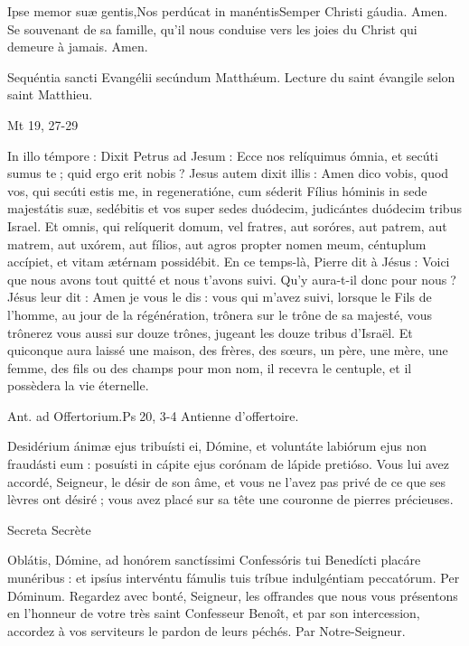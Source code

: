 \begin{paracol}{2}
Ipse memor suæ gentis,Nos perdúcat in manéntisSemper Christi gáudia. Amen.
\switchcolumn
Se souvenant de sa famille, qu’il nous conduise vers les joies du Christ qui demeure à jamais. Amen.
\switchcolumn*

Sequéntia sancti Evangélii secúndum Matthǽum.
\switchcolumn
Lecture du saint évangile selon saint Matthieu.
\switchcolumn*

Mt 19, 27-29
\switchcolumn

\switchcolumn*

In illo témpore : Dixit Petrus ad  Jesum : Ecce nos relíquimus ómnia, et secúti sumus te ; quid ergo erit nobis ? Jesus autem dixit illis : Amen dico vobis, quod vos, qui secúti estis me, in regeneratióne, cum séderit Fílius hóminis in sede majestátis suæ, sedébitis et vos super sedes duódecim, judicántes duódecim tribus Israel. Et omnis, qui relíquerit domum, vel fratres, aut soróres, aut patrem, aut matrem, aut uxórem, aut fílios, aut agros propter nomen meum, céntuplum accípiet, et vitam ætérnam possidébit.
\switchcolumn
En ce temps-là, Pierre dit à Jésus : Voici que nous avons tout quitté et nous t’avons suivi. Qu’y aura-t-il donc pour nous ? Jésus leur dit : Amen je vous le dis : vous qui m’avez suivi, lorsque le Fils de l’homme, au jour de la régénération, trônera sur le trône de sa majesté, vous trônerez vous aussi sur douze trônes, jugeant les douze tribus d’Israël. Et quiconque aura laissé une maison, des frères, des sœurs, un père, une mère, une femme, des fils ou des champs pour mon nom, il recevra le centuple, et il possèdera la vie éternelle.
\switchcolumn*

Ant. ad Offertorium.\hfill Ps 20, 3-4
\switchcolumn
Antienne d’offertoire.
\switchcolumn*

Desidérium ánimæ ejus tribuísti ei, Dómine, et voluntáte labiórum ejus non fraudásti eum : posuísti in cápite ejus corónam de lápide pretióso.
\switchcolumn
Vous lui avez accordé, Seigneur, le désir de son âme, et vous ne l’avez pas privé de ce que ses lèvres ont désiré ; vous avez placé sur sa tête une couronne de pierres précieuses.
\switchcolumn*

Secreta
\switchcolumn
Secrète
\switchcolumn*

Oblátis, Dómine, ad honórem  sanctíssimi Confessóris tui Benedícti placáre munéribus : et ipsíus intervéntu fámulis tuis tríbue indulgéntiam peccatórum. Per Dóminum.
\switchcolumn
Regardez avec bonté, Seigneur, les offrandes que nous vous présentons en l’honneur de votre très saint Confesseur Benoît, et par son intercession, accordez à vos serviteurs le pardon de leurs péchés. Par Notre-Seigneur.
\switchcolumn*


\end{paracol}
